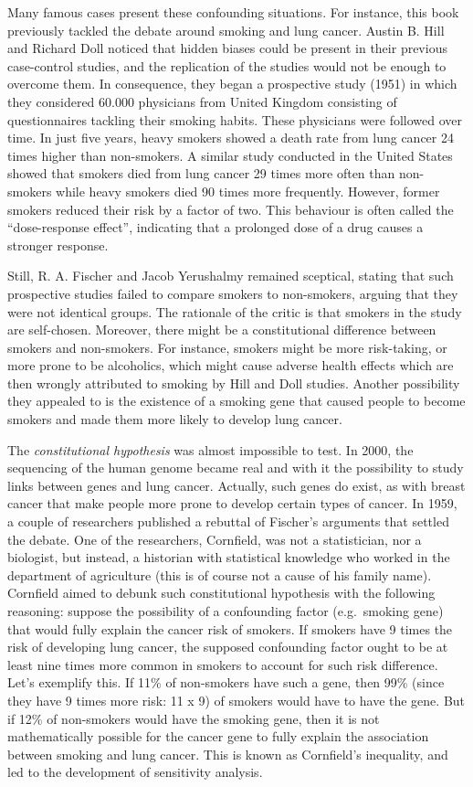 \documentclass[
  12pt,
]{book}
\begin{document}
Many famous cases present these confounding situations. For instance, this book previously tackled the debate around smoking and lung cancer. Austin B. Hill and Richard Doll noticed that hidden biases could be present in their previous case-control studies, and the replication of the studies would not be enough to overcome them. In consequence, they began a prospective study (1951) in which they considered 60.000 physicians from United Kingdom consisting of questionnaires tackling their smoking habits. These physicians were followed over time. In just five years, heavy smokers showed a death rate from lung cancer 24 times higher than non-smokers. A similar study conducted in the United States showed that smokers died from lung cancer 29 times more often than non-smokers while heavy smokers died 90 times more frequently. However, former smokers reduced their risk by a factor of two. This behaviour is often called the ``dose-response effect'', indicating that a prolonged dose of a drug causes a stronger response.

Still, R. A. Fischer and Jacob Yerushalmy remained sceptical, stating that such prospective studies failed to compare smokers to non-smokers, arguing that they were not identical groups. The rationale of the critic is that smokers in the study are self-chosen. Moreover, there might be a constitutional difference between smokers and non-smokers. For instance, smokers might be more risk-taking, or more prone to be alcoholics, which might cause adverse health effects which are then wrongly attributed to smoking by Hill and Doll studies. Another possibility they appealed to is the existence of a smoking gene that caused people to become smokers and made them more likely to develop lung cancer.

The \emph{constitutional hypothesis} was almost impossible to test. In 2000, the sequencing of the human genome became real and with it the possibility to study links between genes and lung cancer. Actually, such genes do exist, as with breast cancer that make people more prone to develop certain types of cancer. In 1959, a couple of researchers published a rebuttal of Fischer's arguments that settled the debate. One of the researchers, Cornfield, was not a statistician, nor a biologist, but instead, a historian with statistical knowledge who worked in the department of agriculture (this is of course not a cause of his family name). Cornfield aimed to debunk such constitutional hypothesis with the following reasoning: suppose the possibility of a confounding factor (e.g.~smoking gene) that would fully explain the cancer risk of smokers. If smokers have 9 times the risk of developing lung cancer, the supposed confounding factor ought to be at least nine times more common in smokers to account for such risk difference. Let's exemplify this. If 11\% of non-smokers have such a gene, then 99\% (since they have 9 times more risk: 11 x 9) of smokers would have to have the gene. But if 12\% of non-smokers would have the smoking gene, then it is not mathematically possible for the cancer gene to fully explain the association between smoking and lung cancer. This is known as Cornfield's inequality, and led to the development of sensitivity analysis.
\end{document}
